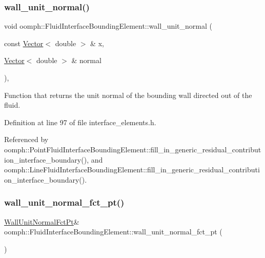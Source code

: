\subsubsection{\texorpdfstring{wall\+\_\+unit\+\_\+normal()}{wall\_unit\_normal()}}
{\footnotesize\ttfamily void oomph\+::\+Fluid\+Interface\+Bounding\+Element\+::wall\+\_\+unit\+\_\+normal (\begin{DoxyParamCaption}\item[{const \hyperlink{classoomph_1_1Vector}{Vector}$<$ double $>$ \&}]{x,  }\item[{\hyperlink{classoomph_1_1Vector}{Vector}$<$ double $>$ \&}]{normal }\end{DoxyParamCaption})\hspace{0.3cm}{\ttfamily [inline]}, {\ttfamily [protected]}}



Function that returns the unit normal of the bounding wall directed out of the fluid. 



Definition at line 97 of file interface\+\_\+elements.\+h.



Referenced by oomph\+::\+Point\+Fluid\+Interface\+Bounding\+Element\+::fill\+\_\+in\+\_\+generic\+\_\+residual\+\_\+contribution\+\_\+interface\+\_\+boundary(), and oomph\+::\+Line\+Fluid\+Interface\+Bounding\+Element\+::fill\+\_\+in\+\_\+generic\+\_\+residual\+\_\+contribution\+\_\+interface\+\_\+boundary().

\mbox{\label{classoomph_1_1FluidInterfaceBoundingElement_a3d8ea7b8e1f22eaaa1235231454b753c}} 
\subsubsection{\texorpdfstring{wall\+\_\+unit\+\_\+normal\+\_\+fct\+\_\+pt()}{wall\_unit\_normal\_fct\_pt()}\hspace{0.1cm}{\footnotesize\ttfamily [1/2]}}
{\footnotesize\ttfamily \hyperlink{classoomph_1_1FluidInterfaceBoundingElement_a09c0b1df7d653eaf55e94e3951d409dd}{Wall\+Unit\+Normal\+Fct\+Pt}\& oomph\+::\+Fluid\+Interface\+Bounding\+Element\+::wall\+\_\+unit\+\_\+normal\+\_\+fct\+\_\+pt (\begin{DoxyParamCaption}{ }\end{DoxyParamCaption})\hspace{0.3cm}{\ttfamily [inline]}}



